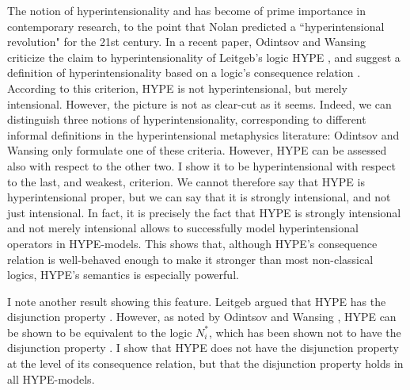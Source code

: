 \documentclass[bsl,meeting]{asl}
\newcommand{\NP}{}
\begin{document}
\thispagestyle{empty}


\NP  
{}

The notion of hyperintensionality and has become of prime importance in contemporary research, to the point that Nolan \cite[p. 149]{Nolan2014-NOLHM} predicted a “hyperintensional revolution" for the 21st century. 
In a recent paper, Odintsov and Wansing \cite{Odintsov2021-ODIRSA} criticize the claim to hyperintensionality of Leitgeb's logic HYPE \cite{Leitgeb2019-LEIHAS}, and suggest a definition of hyperintensionality based on a logic's consequence relation \cite[p. 51]{Odintsov2021-ODIRSA}. According to this criterion, HYPE is not hyperintensional, but merely intensional. However, the picture is not as clear-cut as it seems. Indeed, we can distinguish three notions of hyperintensionality, corresponding to different informal definitions in the hyperintensional metaphysics literature: Odintsov and Wansing only formulate one of these criteria. However, HYPE can be assessed also with respect to the other two. I show it to be hyperintensional with respect to the last, and weakest, criterion. We cannot therefore say that HYPE is hyperintensional proper, but we can say that it is strongly intensional, and not just intensional. In fact, it is precisely the fact that HYPE is strongly intensional and not merely intensional allows to successfully model hyperintensional operators in HYPE-models. This shows that, although HYPE's consequence relation is well-behaved enough to make it stronger than most non-classical logics, HYPE's semantics is especially powerful. 

I note another result showing this feature. Leitgeb argued that HYPE has the disjunction property \cite[p. 346]{Leitgeb2019-LEIHAS}. However, as noted by Odintsov and Wansing \cite[p. 43]{Odintsov2021-ODIRSA}, HYPE can be shown to be equivalent to the logic $N^*_i$, which has been shown not to have the disjunction property \cite[p. 400]{Drobyshevich2015}. I show that HYPE does not have the disjunction property at the level of its consequence relation, but that the disjunction property holds in all HYPE-models.
\end{document}
